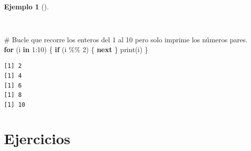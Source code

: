 \documentclass[
  spanish,
  a4paper,
]{scrreport}
\newenvironment{Shaded}{\begin{snugshade}}{\end{snugshade}}
\newcommand{\CommentTok}[1]{\textcolor[rgb]{0.37,0.37,0.37}{#1}}
\newcommand{\ControlFlowTok}[1]{\textcolor[rgb]{0.00,0.23,0.31}{\textbf{#1}}}
\newcommand{\DecValTok}[1]{\textcolor[rgb]{0.68,0.00,0.00}{#1}}
\newcommand{\FunctionTok}[1]{\textcolor[rgb]{0.28,0.35,0.67}{#1}}
\newcommand{\NormalTok}[1]{\textcolor[rgb]{0.00,0.23,0.31}{#1}}
\newcommand{\SpecialCharTok}[1]{\textcolor[rgb]{0.37,0.37,0.37}{#1}}
\theoremstyle{definition}
\theoremstyle{definition}
\newtheorem{example}{Ejemplo}[chapter]
\theoremstyle{remark}
\begin{document}
\begin{example}[]\protect\hypertarget{exm-continuacion-bucle-next}{}\label{exm-continuacion-bucle-next}

~

\begin{Shaded}
\begin{Highlighting}[]
\CommentTok{\# Bucle que recorre los enteros del 1 al 10 pero solo imprime los números pares.}
\ControlFlowTok{for}\NormalTok{ (i }\ControlFlowTok{in} \DecValTok{1}\SpecialCharTok{:}\DecValTok{10}\NormalTok{) \{}
  \ControlFlowTok{if}\NormalTok{ (i }\SpecialCharTok{\%\%} \DecValTok{2}\NormalTok{) \{}
    \ControlFlowTok{next}
\NormalTok{  \}}
  \FunctionTok{print}\NormalTok{(i)}
\NormalTok{\}}
\end{Highlighting}
\end{Shaded}

\begin{verbatim}
[1] 2
[1] 4
[1] 6
[1] 8
[1] 10
\end{verbatim}

\end{example}

\section{Ejercicios}\label{ejercicios-2}
\end{document}
